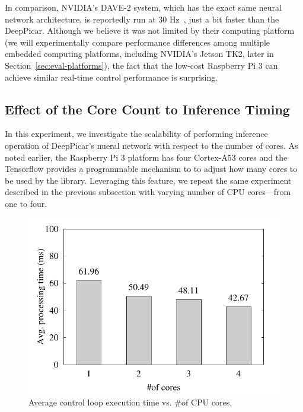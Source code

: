 In comparison, NVIDIA's DAVE-2 system, which has the exact same neural
network architecture, is reportedly run at 30 Hz~\cite{Bojarski2016},
just a bit faster than the DeepPicar. Although we believe it was not
limited by their computing platform (we will experimentally compare
performance differences among multiple embedded computing platforms,
including NVIDIA's Jetson TK2, later in
Section~\ref{sec:eval-platforms}), the fact that the low-cost
Raspberry Pi 3 can achieve similar real-time control performance is
surprising.

\subsection{Effect of the Core Count to Inference Timing}

In this experiment, we investigate the scalability of performing
inference operation of DeepPicar's nueral network with respect to the
number of cores. As noted earlier, the Raspberry Pi 3 platform has
four Cortex-A53 cores and the Tensorflow 
provides a programmable mechanism to to adjust how many cores to be
used by the library. Leveraging this feature, we repeat the
same experiment described in the previous subsection with varying
number of CPU cores---from one to four.


\begin{figure}[h]
  \centering
  \includegraphics[width=.45\textwidth]{figs/perf_vs_corecnt}
  \caption{Average control loop execution time vs. \#of CPU
    cores. }
  \label{fig:perf-vs-corecnt}
\end{figure}


